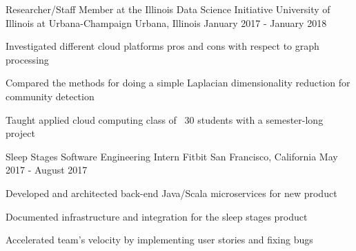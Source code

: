 \begin{cventries}
  \cventry
    {Researcher/Staff Member at the Illinois Data Science Initiative}
    {University of Illinois at Urbana-Champaign}
    {Urbana, Illinois} %
    {January 2017 - January 2018} %
    {
      \begin{cvitems} %
        \item {Investigated different cloud platforms pros and cons with respect to graph processing}
        \item {Compared the methods for doing a simple Laplacian dimensionality reduction for community detection}
        \item {Taught applied cloud computing class of ~30 students with a semester-long project}
      \end{cvitems}
    }

  \cventry
    {Sleep Stages Software Engineering Intern}
    {Fitbit}
    {San Francisco, California} %
    {May 2017 - August 2017} %
    {
      \begin{cvitems} %
        \item {Developed and architected back-end Java/Scala microservices for new product}
        \item {Documented infrastructure and integration for the sleep stages product}
        \item {Accelerated team’s velocity by implementing user stories and fixing bugs}
      \end{cvitems}
    }

\end{cventries}
